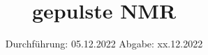 




\graphicspath{ {./figures/} }

\subject{V49}
\title{gepulste NMR}
\date{
  Durchführung: 05.12.2022
  \hspace{3em}
  Abgabe: xx.12.2022
}



\maketitle
\thispagestyle{empty}
\tableofcontents
\newpage





%



\printbibliography{}










%
%
%




%
